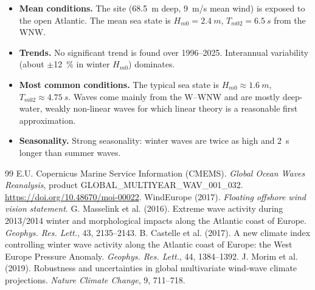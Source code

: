 \documentclass[11pt,a4paper]{article}
\newcommand{\Hs}{H_{m0}}
\newcommand{\Tm}{T_{m02}}
\begin{document}
\begin{itemize}
  \item \textbf{Mean conditions.} The site (\SI{68.5}{m} deep, \SI{9}{m/s} mean wind) is exposed to the open Atlantic. The mean sea state is $\Hs=\SI{2.4}{m}$, $\Tm=\SI{6.5}{s}$ from the WNW.
  \item \textbf{Trends.} No significant trend is found over 1996--2025. Interannual variability (about $\pm$\SI{12}{\percent} in winter $\Hs$) dominates.
  \item \textbf{Most common conditions.} The typical sea state is $\Hs\approx\SI{1.6}{m}$, $\Tm\approx\SI{4.75}{s}$. Waves come mainly from the W--WNW and are mostly deep-water, weakly non-linear waves for which linear theory is a reasonable first approximation.
  \item \textbf{Seasonality.} Strong seasonality: winter waves are twice as high and \SI{2}{s} longer than summer waves.
\end{itemize}

\begin{thebibliography}{99}\small
{} E.U. Copernicus Marine Service Information (CMEMS). \emph{Global Ocean Waves Reanalysis}, product GLOBAL\_MULTIYEAR\_WAV\_001\_032. \url{https://doi.org/10.48670/moi-00022}.
 WindEurope (2017). \emph{Floating offshore wind vision statement}.
 G. Masselink et al. (2016). Extreme wave activity during 2013/2014 winter and morphological impacts along the Atlantic coast of Europe. \emph{Geophys. Res. Lett.}, 43, 2135--2143.
 B. Castelle et al. (2017). A new climate index controlling winter wave activity along the Atlantic coast of Europe: the West Europe Pressure Anomaly. \emph{Geophys. Res. Lett.}, 44, 1384--1392.
 J. Morim et al. (2019). Robustness and uncertainties in global multivariate wind-wave climate projections. \emph{Nature Climate Change}, 9, 711--718.
\end{thebibliography}
\end{document}
